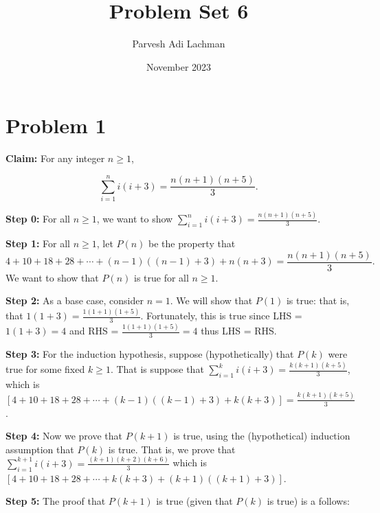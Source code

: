 \documentclass{article}
\title{Problem Set 6}
\author{Parvesh Adi Lachman}
\date{November 2023}
\begin{document}
\maketitle

\section{Problem 1}

\textbf{Claim:} For any integer $n\geq 1$,

\begin{equation}
	\sum_{i=1}^{n} i(i+3)=\frac{n(n+1)(n+5)}{3}.
\end{equation}

\textbf{Step 0:} For all $n\geq 1$, we want to show $\sum_{i=1}^{n} i(i+3)=\frac{n(n+1)(n+5)}{3}$.
\vspace{15pt}

\textbf{Step 1:} For all $n\geq 1$, let $P(n)$ be the property that 
\[
	4+10+18+28+\cdots+(n-1)((n-1)+3)+n(n+3)=\frac{n(n+1)(n+5)}{3}.
\]  
\hspace{15pt}We want to show that $P(n)$ is true for all $n\geq 1$.

\vspace{15pt}

\textbf{Step 2:} As a base case, consider $n=1$\@. We will show that $P(1)$ is true: that is, that $1(1+3)=\frac{1(1+1)(1+5)}{3}$\@. Fortunately, this is true since LHS = $1(1+3)=4$ and RHS = $\frac{1(1+1)(1+5)}{3}=4$ thus LHS = RHS. 

\vspace{15pt}

\textbf{Step 3:} For the induction hypothesis, suppose (hypothetically) that $P(k)$ were true for some fixed $k\geq 1$. That is suppose that $\sum_{i=1}^{k} i(i+3)=\frac{k(k+1)(k+5)}{3}$, which is $[4+10+18+28+\cdots +(k-1)((k-1)+3)+k(k+3)]=\frac{k(k+1)(k+5)}{3}$.

\vspace{15pt}

\textbf{Step 4:} Now we prove that $P(k+1)$ is true, using the (hypothetical) induction assumption that $P(k)$ is true. That is, we prove that $\sum_{i=1}^{k+1} i(i+3)=\frac{(k+1)(k+2)(k+6)}{3}$ which is $[4+10+18+28+\cdots+k(k+3)+(k+1)((k+1)+3)]$.

\pagebreak

\textbf{Step 5:} The proof that $P(k+1)$ is true (given that $P(k)$ is true) is a follows:

\vspace{10pt}
\end{document}
